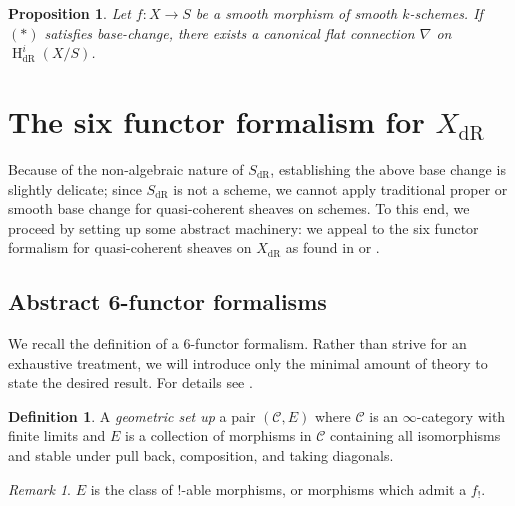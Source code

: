 \documentclass{article}
\newtheorem{proposition}[theorem]{Proposition}
\theoremstyle{definition}
\newtheorem{definition}[theorem]{Definition}
\theoremstyle{remark}
\newtheorem{remark}[theorem]{Remark}
\DeclareMathOperator{\dr}{dR}
\DeclareMathOperator{\h}{H}
\begin{document}
\begin{proposition} Let $f: X \to S$ be a smooth morphism of smooth $k$-schemes. If $(\ast)$ satisfies base-change, there exists a canonical flat connection $\nabla$ on $\h^i_{\dr}(X/S)$.
\end{proposition}


\section{The six functor formalism for $X_{\dr}$}

 Because of the non-algebraic nature of $S_{\dr}$, establishing the above base change is slightly delicate; since $S_{\dr}$ is not a scheme, we cannot apply traditional proper or smooth base change for quasi-coherent sheaves on schemes. To this end, we proceed by setting up some abstract machinery: we appeal to the six functor formalism for quasi-coherent sheaves on $X_{\dr}$ as found in \cite{Rib24} or \cite{Rod25}.



\subsection{Abstract 6-functor formalisms}

We recall the definition of a 6-functor formalism. Rather than strive for an exhaustive treatment, we will introduce only the minimal amount of theory to state the desired result. For details see \cite{Sch22}.


\begin{definition} A \emph{geometric set up} a pair $(\mathcal{C}, E)$ where $\mathcal{C}$ is an $\infty$-category with finite limits and $E$ is a collection of morphisms in $\mathcal{C}$ containing all isomorphisms and stable under pull back, composition, and taking diagonals.
\end{definition}

\begin{remark}
$E$ is the class of $!$-able morphisms, or morphisms which admit a $f_!$.
\end{remark}
\end{document}
